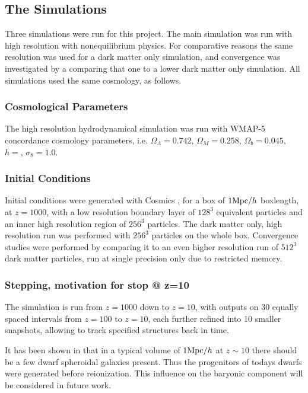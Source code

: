 \documentclass[useAMS,usenatbib]{mn2e}
\begin{document}
\subsection{The Simulations}
Three simulations were run for this project. The main simulation was
run with high resolution with nonequilibrium physics. For comparative
reasons the same resolution was used for a dark matter only
simulation, and convergence was investigated by a comparing that one
to a lower dark matter only simulation. All simulations used the same
cosmology, as follows.

\subsubsection{Cosmological Parameters}
The high resolution hydrodynamical simulation was run with WMAP-5
concordance cosmology parameters, i.e. $\Omega_\Lambda=0.742$,
$\Omega_M=0.258$, $\Omega_b=0.045$, $h=$, $\sigma_8=1.0$.

\subsubsection{Initial Conditions}
Initial conditions were generated with {\sc Cosmics}
\citep{Bertschinger1995}, for a box of $1{\rm Mpc}/h$ boxlength, at
$z=1000$, with a low resolution boundary layer of $128^3$ equivalent
particles and an inner high resolution region of $256^3$
particles. The dark matter only, high resolution run was performed
with $256^3$ particles on the whole box. Convergence studies were
performed by comparing it to an even higher resolution run of $512^3$
dark matter particles, run at single precision only due to restricted
memory.

\subsubsection{Stepping, motivation for stop @ z=10}
The simulation is run from $z=1000$ down to $z=10$, with outputs on
$30$ equally spaced intervals from $z=100$ to $z=10$, each further
refined into 10 smaller snapshots, allowing to track specified
structures back in time.

It has been shown in \citep{Boley2009} that in a typical volume of
$1{\rm Mpc}/h$ at $z\sim10$ there should be a few dwarf spheroidal
galaxies present. Thus the progenitors of todays dwarfs were generated
before reionization. This influence on the baryonic component will be
considered in future work.
\end{document}
